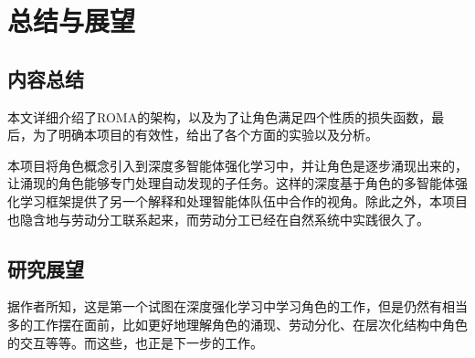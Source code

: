 
\chapter{总结与展望}

\section{内容总结}
本文详细介绍了ROMA的架构，以及为了让角色满足四个性质的损失函数，最后，为了明确本项目的有效性，给出了各个方面的实验以及分析。

本项目将角色概念引入到深度多智能体强化学习中，并让角色是逐步涌现出来的，让涌现的角色能够专门处理自动发现的子任务。这样的深度基于角色的多智能体强化学习框架提供了另一个解释和处理智能体队伍中合作的视角。除此之外，本项目也隐含地与劳动分工联系起来，而劳动分工已经在自然系统中实践很久了。

\section{研究展望}
据作者所知，这是第一个试图在深度强化学习中学习角色的工作，但是仍然有相当多的工作摆在面前，比如更好地理解角色的涌现、劳动分化、在层次化结构中角色的交互等等。而这些，也正是下一步的工作。
